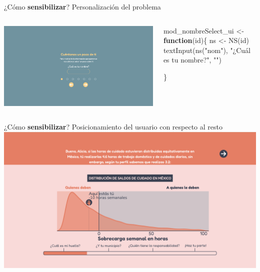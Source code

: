 \documentclass[
  ignorenonframetext,
]{beamer}
\newenvironment{Shaded}{\begin{snugshade}}{\end{snugshade}}
\newcommand{\ControlFlowTok}[1]{\textcolor[rgb]{0.13,0.29,0.53}{\textbf{#1}}}
\newcommand{\FunctionTok}[1]{\textcolor[rgb]{0.00,0.00,0.00}{#1}}
\newcommand{\NormalTok}[1]{#1}
\newcommand{\OtherTok}[1]{\textcolor[rgb]{0.56,0.35,0.01}{#1}}
\newcommand{\StringTok}[1]{\textcolor[rgb]{0.31,0.60,0.02}{#1}}
\begin{document}
\begin{frame}[fragile]{¿Cómo \textbf{sensibilizar}? Personalización del
problema}
\protect\hypertarget{cuxf3mo-sensibilizar-personalizaciuxf3n-del-problema}{}
\begin{columns}[T]
\begin{column}{0.48\textwidth}
\href{https://huelladecuidados.datacivica.org/\#Ps-1}{\includegraphics{img/preguntas/p1.png}}
\end{column}

\begin{column}{0.48\textwidth}
\begin{Shaded}
\begin{Highlighting}[]
\NormalTok{mod\_nombreSelect\_ui }\OtherTok{\textless{}{-}} \ControlFlowTok{function}\NormalTok{(id)\{}
\NormalTok{  ns }\OtherTok{\textless{}{-}} \FunctionTok{NS}\NormalTok{(id)}
  \FunctionTok{textInput}\NormalTok{(}\FunctionTok{ns}\NormalTok{(}\StringTok{"nom"}\NormalTok{), }\StringTok{"¿Cuál es tu nombre?"}\NormalTok{, }\StringTok{""}\NormalTok{)}

\NormalTok{\}}
\end{Highlighting}
\end{Shaded}
\end{column}
\end{columns}
\end{frame}

\begin{frame}{¿Cómo \textbf{sensibilizar}? Posicionamiento del usuario
con respecto al resto}
\protect\hypertarget{cuxf3mo-sensibilizar-posicionamiento-del-usuario-con-respecto-al-resto}{}
\href{https://huelladecuidados.datacivica.org/\#mi-huella-1}{\includegraphics{img/preguntas/distri.png}}
\end{frame}
\end{document}
